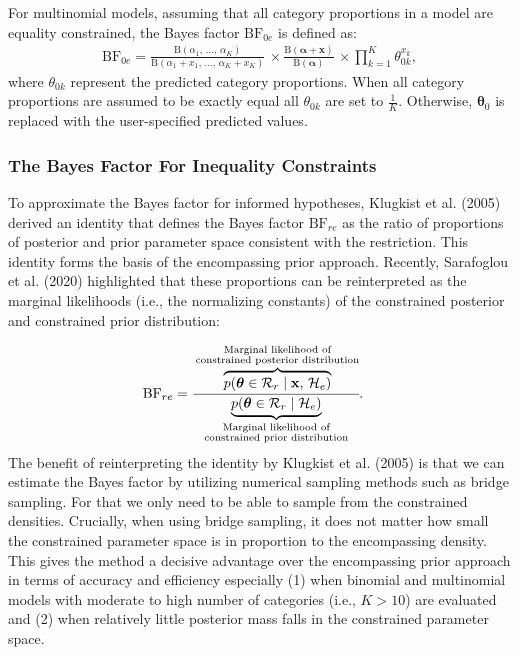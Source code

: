 \documentclass[
  english,
  man,floatsintext]{apa6}
\begin{document}
For multinomial models, assuming that all category proportions in a model are equality constrained, the Bayes factor \(\text{BF}_{0e}\) is defined as:
\begin{align*}
\text{BF}_{0e} =  \frac{
 \text{B}\left(\alpha_{1}\text{, }\dots\text{, }\alpha_K\right)}{\text{B}\left(\alpha_1+x_1\text{, }\dots\text{, }\alpha_K+x_K\right)} \, \times 
\frac{\text{B}(\boldsymbol{\alpha}+\mathbf{x})}{\text{B}(\boldsymbol{\alpha})} \, \times  \prod_{k=1}^K \theta_{0k}^{x_k},
\end{align*}
where \(\theta_{0k}\) represent the predicted category proportions. When all category proportions are assumed to be exactly equal all \(\theta_{0k}\) are set to \(\frac{1}{K}\). Otherwise, \(\boldsymbol{\theta}_{0}\) is replaced with the user-specified predicted values.

\hypertarget{the-bayes-factor-for-inequality-constraints}{%
\subsubsection{The Bayes Factor For Inequality Constraints}\label{the-bayes-factor-for-inequality-constraints}}

\noindent To approximate the Bayes factor for informed hypotheses, Klugkist et al. (2005) derived an identity that defines the Bayes factor \(\text{BF}_{re}\) as the ratio of proportions of posterior and prior parameter space consistent with the restriction. This identity forms the basis of the encompassing prior approach. Recently, Sarafoglou et al. (2020) highlighted that these proportions can be reinterpreted as the marginal likelihoods (i.e., the normalizing constants) of the constrained posterior and constrained prior distribution:

\begin{align}
\label{Eq:klugkistIdentity}
\text{BF}_{re} &= \cfrac{\overbrace{p(\boldsymbol{\theta} \in \mathcal{R}_r \mid \mathbf{x}\text{, }\mathcal{H}_e)}^{\substack{\text{Marginal likelihood of}\\\text{constrained posterior distribution}}}}{\underbrace{p(\boldsymbol{\theta} \in \mathcal{R}_r \mid  \mathcal{H}_e)}_{\substack{\text{Marginal likelihood of}\\\text{constrained prior distribution}}}}.
\end{align}
The benefit of reinterpreting the identity by Klugkist et al. (2005) is that we can estimate the Bayes factor by utilizing numerical sampling methods such as bridge sampling. For that we only need to be able to sample from the constrained densities. Crucially, when using bridge sampling, it does not matter how small the constrained parameter space is in proportion to the encompassing density. This gives the method a decisive advantage over the encompassing prior approach in terms of accuracy and efficiency especially (1) when binomial and multinomial models with moderate to high number of categories (i.e., \(K > 10\)) are evaluated and (2) when relatively little posterior mass falls in the constrained parameter space.
\end{document}
